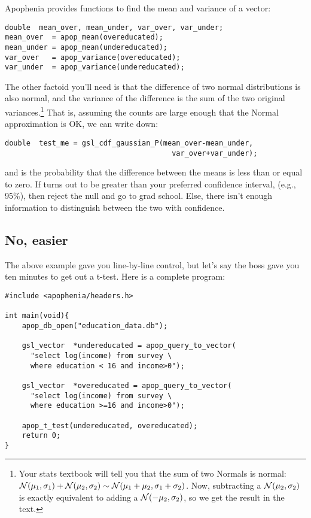 Apophenia provides functions to find the mean and variance of a vector:

\begin{lstlisting}
double	mean_over, mean_under, var_over, var_under;
mean_over  = apop_mean(overeducated);
mean_under = apop_mean(undereducated);
var_over   = apop_variance(overeducated);
var_under  = apop_variance(undereducated);
\end{lstlisting}

The other factoid you'll need is that the difference of two normal
distributions is also normal, and the variance of the difference is
the sum of the two original variances.\footnote{Your stats textbook
will tell you that the sum of two Normals is normal: ${\cal N}(\mu_1,
\sigma_1) + {\cal N}(\mu_2, \sigma_2) \sim {\cal N}(\mu_1 + \mu_2,
\sigma_1 + \sigma_2)$. Now, subtracting a ${\cal N}(\mu_2, \sigma_2)$
is exactly equivalent to adding a ${\cal N}(-\mu_2, \sigma_2)$, so we
get the result in the text.} That is, assuming the counts are large
enough that the Normal approximation is OK, we can write down:

\begin{lstlisting}
double	test_me = gsl_cdf_gaussian_P(mean_over-mean_under, 
                                       var_over+var_under);
\end{lstlisting}

and  is the probability that the difference between the
means is less than or equal to zero. If  turns out to be greater
than your preferred confidence interval, (e.g., 95\%), then reject the
null and go to grad school. Else, there isn't enough information to
distinguish between the two with confidence.

\subsection{No, easier} The above example gave you line-by-line
control, but let's say the boss gave you ten minutes to get out a
t-test. Here is a complete program:

\begin{lstlisting}
#include <apophenia/headers.h>

int main(void){
    apop_db_open("education_data.db");

    gsl_vector	*undereducated = apop_query_to_vector(
      "select log(income) from survey \
      where education < 16 and income>0");

    gsl_vector	*overeducated = apop_query_to_vector(
      "select log(income) from survey \
      where education >=16 and income>0");

    apop_t_test(undereducated, overeducated);
    return 0;
}
\end{lstlisting}

